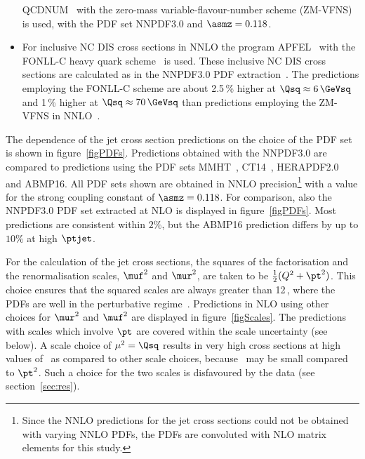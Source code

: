 \documentclass[12pt]{article}
\begin{document}
\begin{itemize}
    QCDNUM~\cite{qcdnum} with the zero-mass variable-flavour-number
    scheme (ZM-VFNS)~\cite{zmvfns} is used, with 
    the PDF set NNPDF3.0 and $\asmz=0.118$.
  \item   For inclusive NC DIS cross sections in NNLO the program APFEL~\cite{apfel1,apfel2} with the FONLL-C heavy quark scheme~\cite{fonllc} is used.
    These inclusive NC DIS cross sections are calculated as in the NNPDF3.0 PDF extraction~\cite{apfel2}.
    The predictions employing the FONLL-C scheme are about 2.5\,\% higher at $\Qsq\approx 6\,\GeVsq$ and 1\,\% higher at $\Qsq\approx  70\,\GeVsq$ than predictions employing the ZM-VFNS in NNLO~\cite{zmnnlo1,zmnnlo2,zmnnlo3,zmnnlo4}.
\end{itemize}

    The dependence of the jet cross section predictions on the choice of the PDF set is shown in figure~\ref{figPDFs}.
    Predictions obtained with the NNPDF3.0 are compared to predictions
    using the PDF sets MMHT~\cite{MMHT}, CT14~\cite{CT14},
    HERAPDF2.0~\cite{HERA20} and ABMP16\cite{Alekhin:2016uxn}.
    All PDF sets shown are obtained in NNLO precision\footnote{Since the NNLO predictions for the jet cross sections could not be obtained with varying NNLO PDFs, the PDFs are convoluted with NLO matrix elements for this study.} with a value for the strong coupling constant of $\asmz=0.118$.
    For comparison, also the NNPDF3.0 PDF set extracted at NLO is displayed in figure~\ref{figPDFs}.
    Most predictions are consistent within $2\%$, but the ABMP16
    prediction differs by up to $10\%$ at high $\ptjet$. 

    For the calculation of the jet cross sections, the squares of the factorisation and
    the renormalisation scales, $\muf^2$ and $\mur^2$, are taken to be $\tfrac{1}{2}(Q^2 + \pt^{2})$. 
    This choice ensures that the squared  scales are always greater than 12\,\GeVsq, where the
    PDFs are well in the perturbative regime~\cite{HERA20,PertStab}.
    Predictions in NLO using other choices for $\mur^2$ and $\muf^2$ are displayed in figure~\ref{figScales}.
    The predictions with scales which involve $\pt$ are  covered within the scale uncertainty (see below).
    A scale choice of $\mu^2=\Qsq$ results in very high cross sections at high values of \pt\ as 
    compared to other scale choices, because \Qsq\ may be small compared to $\pt^2$. 
    Such a choice for the two scales is  disfavoured by the data (see section~\ref{sec:res}).
\end{document}
